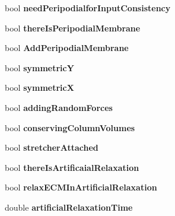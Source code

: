 \begin{DoxyCompactItemize}
\item 
\hypertarget{classSimulation_a31d908b8560f3da1a2524481c970449c}{}bool {\bfseries need\+Peripodialfor\+Input\+Consistency}\label{classSimulation_a31d908b8560f3da1a2524481c970449c}

\item 
\hypertarget{classSimulation_a43db0752ce3c4d11a6268e7896a021f0}{}bool {\bfseries there\+Is\+Peripodial\+Membrane}\label{classSimulation_a43db0752ce3c4d11a6268e7896a021f0}

\item 
\hypertarget{classSimulation_ac95f47d33f702be850831edff2a6973e}{}bool {\bfseries Add\+Peripodial\+Membrane}\label{classSimulation_ac95f47d33f702be850831edff2a6973e}

\item 
\hypertarget{classSimulation_aa6b15db1d6838c8387e3cce18dc469b1}{}bool {\bfseries symmetric\+Y}\label{classSimulation_aa6b15db1d6838c8387e3cce18dc469b1}

\item 
\hypertarget{classSimulation_ab224011afb730f28d57d12db3160c4ed}{}bool {\bfseries symmetric\+X}\label{classSimulation_ab224011afb730f28d57d12db3160c4ed}

\item 
\hypertarget{classSimulation_af8c661769aba37b7374be811dc230e01}{}bool {\bfseries adding\+Random\+Forces}\label{classSimulation_af8c661769aba37b7374be811dc230e01}

\item 
\hypertarget{classSimulation_a1dd66be606281f44c05ec6b4f8eed882}{}bool {\bfseries conserving\+Column\+Volumes}\label{classSimulation_a1dd66be606281f44c05ec6b4f8eed882}

\item 
\hypertarget{classSimulation_ab998930bbef90a5a59ba86079a44e7ae}{}bool {\bfseries stretcher\+Attached}\label{classSimulation_ab998930bbef90a5a59ba86079a44e7ae}

\item 
\hypertarget{classSimulation_adabe1c2bf2cb95e122fe157ddf4c170e}{}bool {\bfseries there\+Is\+Artificaial\+Relaxation}\label{classSimulation_adabe1c2bf2cb95e122fe157ddf4c170e}

\item 
\hypertarget{classSimulation_a9cb11c44d4b8ae638fb8c4bdce400c37}{}bool {\bfseries relax\+E\+C\+M\+In\+Artificial\+Relaxation}\label{classSimulation_a9cb11c44d4b8ae638fb8c4bdce400c37}

\item 
\hypertarget{classSimulation_a7a394751dc6e09dec25db763d94cbdf9}{}double {\bfseries artificial\+Relaxation\+Time}\label{classSimulation_a7a394751dc6e09dec25db763d94cbdf9}


\end{DoxyCompactItemize}
